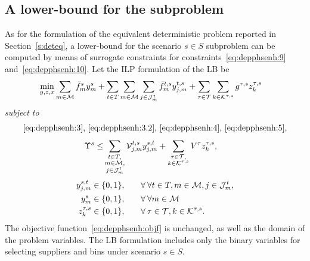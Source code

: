 \documentclass[a4paper,11pt]{article}
\begin{document}
	\subsection{A lower-bound for the subproblem}
	As for the formulation of the equivalent deterministic problem reported in Section~\ref{s:deteq}, a lower-bound for the scenario $ s \in S$ subproblem can be computed by means of surrogate constraints for constraints~\eqref{eq:depphsenh:9} and~\eqref{eq:depphsenh:10}.
	Let the ILP formulation of the LB be
	\begin{equation*}
	\begin{split}
		\min_{y,z,x} & \sum_{m \in \cal M} \bar{f}^s_m y^s_{m} + \sum_{t \in T} \sum_{m \in {{\cal M}}} \sum_{j \in {\cal J}_{m}^t} \bar{f}_{m}^{t,s} y^{t,s}_{j,m} + \sum_{\tau \in \cal T} \sum_{k \in {\cal K}^{\tau,s}} g^{\tau,s} z_k^{\tau,s}\label{eq:depphsenhlb:objf}
	\end{split}
	\end{equation*}
	\textit{subject to}
	\begin{equation*}
		\eqref{eq:depphsenh:3}, \, \eqref{eq:depphsenh:3.2}, \, \eqref{eq:depphsenh:4}, \, \eqref{eq:depphsenh:5},
	\end{equation*}
	\begin{alignat}{2}		
		\Upsilon^s \leq & \sum\limits_{\substack{t \in T, \\ m \in {\cal M}, \\ j \in {\cal J}^t_{m}}} {\cal V}_{j,m}^{t,s} y^{s,t}_{j,m} + \sum\limits_{\substack{\tau \in {\cal T}, \\ k \in {\cal K}^{\tau, s} }} V^{\tau} z_k^{\tau,s}, \label{eq:depphsenhlb:10}
	\end{alignat}
	\begin{alignat*}{2}		
		y^{s,t}_{j,m} \in \{0, 1\}, & \qquad \forall \: \forall t \in T, m \in {\cal M}, j \in {\cal J}^t_{m},\\
		y^s_{m} \in \{0, 1\}, & \qquad \forall \: \forall m \in \cal M \\
		z_k^{\tau,s} \in \{0, 1\}, & \qquad \forall \: \tau \in {\cal T} , k \in {\cal K}^{\tau,s}.
	\end{alignat*}
	The objective function~\eqref{eq:depphsenh:objf} is unchanged, as well as the domain of the problem variables.
	The LB formulation includes only the binary variables for selecting suppliers and bins under scenario $ s \in S$.
\end{document}

